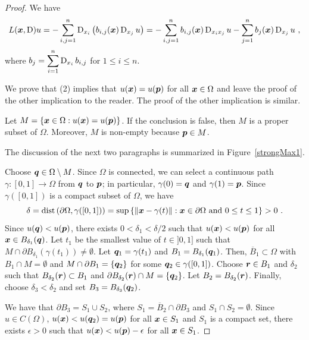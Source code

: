 \begin{proof}
We have
\begin{equation} \label{strongMaxAEq3}
L({\bm{x}},\operatorname{D})u = - \sum_{i,j=1}^n
\operatorname{D}_{x_i} \left( b_{i,j}({\bm{x}}) \operatorname{D}_{x_j} u \right)
= - \sum_{i,j=1}^n b_{i,j}({\bm{x}}) \operatorname{D}_{x_i x_j} u
- \sum_{j=1}^n b_j({\bm{x}}) \operatorname{D}_{x_j} u \ ,
\end{equation}
where $\displaystyle b_j = \sum_{i=1}^n \operatorname{D}_{x_i} b_{i,j}$ for
$1 \leq i \leq n$.

We prove that (2) implies that $u({\bm{x}})= u({\bm{p}})$ for all
${\bm{x}} \in \Omega$ and leave the proof of the other implication to
the reader.  The proof of the other implication is similar.

Let $M = \left\{ {\bm{x}} \in \Omega : u({\bm{x}}) = u({\bm{p}}) \right\}$.
If the conclusion is false, then $M$ is a proper subset of $\Omega$.
Moreover, $M$ is non-empty because ${\bm{p}} \in M$.

The discussion of the next two paragraphs is summarized in
Figure~\ref{strongMax1}.

Choose ${\bm{q}} \in \Omega \setminus M$.  Since $\Omega$ is connected,
we can select a continuous path $\gamma:[0,1] \to \Omega$ from
${\bm{q}}$ to ${\bm{p}}$; in particular, $\gamma(0) = {\bm{q}}$ and
$\gamma(1) = {\bm{p}}$. 
Since $\gamma([0,1])$ is a compact subset of $\Omega$, we have
\[
  \delta = \mathrm{dist}\left(\partial \Omega,\gamma([0,1])\right)
= \sup\left\{ \|{\bm{x}} - \gamma(t)\| : {\bm{x}} \in \partial \Omega \
  \text{and} \ 0 \leq t \leq 1 \right\} > 0  \ .
\]
Since $u({\bm{q}}) < u({\bm{p}})$, there exists $0 < \delta_1 < \delta/2$
such that $u({\bm{x}}) < u({\bm{p}})$ for all ${\bm{x}} \in B_{\delta_1}({\bm{q}})$.
Let $t_1$ be the smallest value of $t \in ]0,1]$ such that
$M \cap \partial B_{\delta_1}(\gamma(t_1)) \neq \emptyset$.
Let ${\bm{q}}_1 = \gamma(t_1)$ and $B_1 = B_{\delta_1}({\bm{q}}_1)$.
Then, $\overline{B}_1 \subset \Omega$ with $B_1 \cap M = \emptyset$ and
$M \cap \partial B_1 = \{ {\bm{q}}_2 \}$ for some
${\bm{q}}_2 \in \gamma([0,1])$.
Choose ${\bm{r}} \in B_1$ and $\delta_2$ such that
$B_{\delta_2}({\bm{r}}) \subset B_1$ and
$\partial B_{\delta_2}({\bm{r}}) \cap M = \{ {\bm{q}}_2 \}$.
Let $B_2 = B_{\delta_2}({\bm{r}})$.
Finally, choose $\delta_3 < \delta_2$ and set
$B_3 = B_{\delta_3}({\bm{q}}_2)$.

We have that $\partial B_3 = S_1 \cup S_2$, where
$S_1 = \overline{B}_2 \cap \partial B_3$ and $S_1 \cap S_2 = \emptyset$.
Since $u \in C(\Omega)$, $u({\bm{x}}) < u({\bm{q}}_2) = u({\bm{p}})$
for all ${\bm{x}} \in S_1$ and $S_1$ is a compact set, there exists
$\epsilon >0$ such that $u({\bm{x}}) < u({\bm{p}}) - \epsilon$ for all
${\bm{x}} \in S_1$.


\end{proof}
